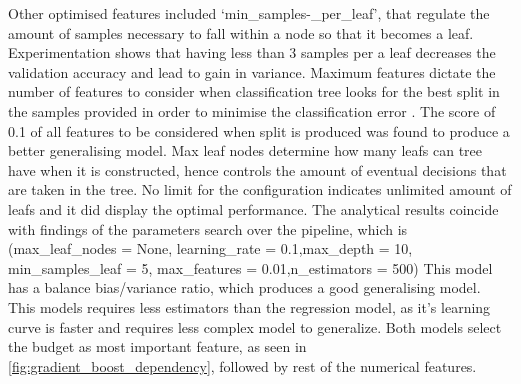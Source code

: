 Other optimised features included ‘min\_samples-\_per\_leaf’, that regulate the amount of samples necessary to fall within a node so that it becomes a leaf. Experimentation shows that having less than 3 samples per a leaf decreases the validation accuracy and lead to gain in variance.  Maximum features dictate the number of features to consider when classification tree looks for the best split in the samples provided in order to minimise the classification error \cite{tan2006classification}. The score of 0.1 of all features to be considered when split is produced was found to produce a better generalising model. Max leaf nodes determine how many leafs can tree have when it is constructed, hence controls the amount of eventual decisions that are taken in the tree. No limit for the configuration indicates unlimited amount of leafs and it did display the optimal performance.  The analytical results coincide with findings of the parameters search over the pipeline, which is (max\_leaf\_nodes = None, learning\_rate = 0.1,max\_depth =  10, min\_samples\_leaf = 5, max\_features = 0.01,n\_estimators = 500)­ This model has a balance bias/variance ratio, which produces a good generalising model. This models requires less estimators than the regression model, as it’s learning curve is faster and requires less complex model to generalize. Both models select the budget as most important feature, as seen in \figurename{} \ref{fig:gradient_boost_dependency}, followed by rest of the numerical features.


